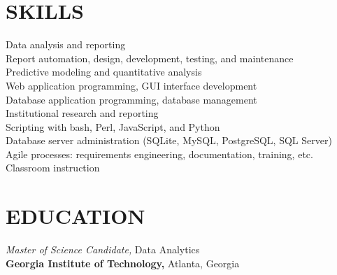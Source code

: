 \documentclass[margin, 10pt]{res} %
\begin{document}
\begin{resume}

 
\section{SKILLS}  

Data analysis and reporting\\
Report automation, design, development, testing, and maintenance\\
Predictive modeling and quantitative analysis\\
Web application programming, GUI interface development\\
Database application programming, database management\\
Institutional research and reporting\\
Scripting with bash, Perl, JavaScript, and Python\\
Database server administration (SQLite, MySQL, PostgreSQL, SQL Server)\\
Agile processes: requirements engineering, documentation, training, etc.\\
Classroom instruction\\


\section{EDUCATION}


{\it Master of Science Candidate,} Data Analytics\\
\textbf{Georgia Institute of Technology,} Atlanta, Georgia


\end{resume}
\end{document}

